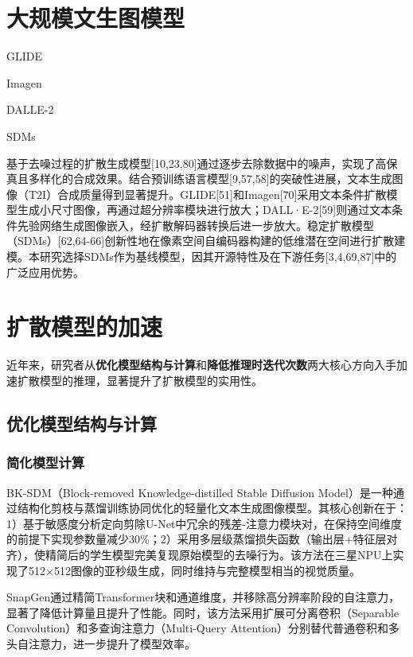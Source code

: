\documentclass[11pt,a4paper,UTF8]{ctexart}
\begin{document}
\section{大规模文生图模型}

GLIDE

Imagen

DALLE-2

SDMs

基于去噪过程的扩散生成模型[10,23,80]通过逐步去除数据中的噪声，实现了高保真且多样化的合成效果。结合预训练语言模型[9,57,58]的突破性进展，文本生成图像（T2I）合成质量得到显著提升。GLIDE[51]和Imagen[70]采用文本条件扩散模型生成小尺寸图像，再通过超分辨率模块进行放大；DALL·E-2[59]则通过文本条件先验网络生成图像嵌入，经扩散解码器转换后进一步放大。稳定扩散模型（SDMs）[62,64-66]创新性地在像素空间自编码器构建的低维潜在空间进行扩散建模。本研究选择SDMs作为基线模型，因其开源特性及在下游任务[3,4,69,87]中的广泛应用优势。


\section{扩散模型的加速}

近年来，研究者从\textbf{优化模型结构与计算}和\textbf{降低推理时迭代次数}两大核心方向入手加速扩散模型的推理，显著提升了扩散模型的实用性。

\subsection{优化模型结构与计算}

\subsubsection{简化模型计算}

BK-SDM（Block-removed Knowledge-distilled Stable Diffusion Model）是一种通过结构化剪枝与蒸馏训练协同优化的轻量化文本生成图像模型。其核心创新在于：1）基于敏感度分析定向剪除U-Net中冗余的残差-注意力模块对，在保持空间维度的前提下实现参数量减少30\%；2）采用多层级蒸馏损失函数（输出层+特征层对齐），使精简后的学生模型完美复现原始模型的去噪行为。该方法在三星NPU上实现了512×512图像的亚秒级生成，同时维持与完整模型相当的视觉质量。

SnapGen\cite{hu2024snapgen}通过精简Transformer块和通道维度，并移除高分辨率阶段的自注意力，显著了降低计算量且提升了性能。同时，该方法采用扩展可分离卷积（Separable Convolution）\cite{howard2017mobilenets}和多查询注意力（Multi-Query Attention）\cite{shazeer2019fast}分别替代普通卷积和多头自注意力，进一步提升了模型效率。
\end{document}
